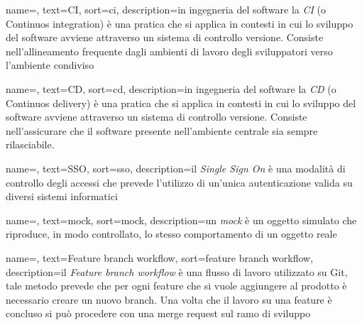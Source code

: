 {
    name=,
    text=CI,
    sort=ci,
    description={in ingegneria del software la \emph{CI} (o Continuos integration) è una pratica che si applica in contesti in cui lo sviluppo del software avviene attraverso un sistema di controllo versione. Consiste nell'allineamento frequente dagli ambienti di lavoro degli sviluppatori verso l'ambiente condiviso}
}

{
    name=,
    text=CD,
    sort=cd,
    description={in ingegneria del software la \emph{CD} (o Continuos delivery) è una pratica che si applica in contesti in cui lo sviluppo del software avviene attraverso un sistema di controllo versione. Consiste nell'assicurare che il software presente nell'ambiente centrale sia sempre rilasciabile.}
}

{
    name=,
    text=SSO,
    sort=sso,
    description={il \emph{Single Sign On} è una modalità di controllo degli accessi che prevede l'utilizzo di un'unica autenticazione valida su diversi sistemi informatici}
}

{
    name=,
    text=mock,
    sort=mock,
    description={un \emph{mock} è un oggetto simulato che riproduce, in modo controllato, lo stesso comportamento di un oggetto reale}
}

{
    name=,
    text=Feature branch workflow,
    sort=feature branch workflow,
    description={il \emph{Feature branch workflow} è una flusso di lavoro utilizzato su Git, tale metodo prevede che per ogni feature che si vuole aggiungere al prodotto è necessario creare un nuovo branch. Una volta che il lavoro su una feature è concluso si può procedere con una merge request sul ramo di sviluppo}
}